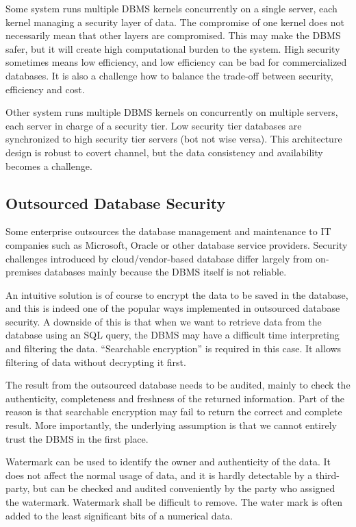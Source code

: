 Some system runs multiple DBMS kernels concurrently on a single server, each kernel managing a security layer of data. The compromise of one kernel does not necessarily mean that other layers are compromised. This may make the DBMS safer, but it will create high computational burden to the system. High security sometimes means low efficiency, and low efficiency can be bad for commercialized databases. It is also a challenge how to balance the trade-off between security, efficiency and cost.

Other system runs multiple DBMS kernels on concurrently on multiple servers, each server in charge of a security tier. Low security tier databases are synchronized to high security tier servers (bot not wise versa). This architecture design is robust to covert channel, but the data consistency and availability becomes a challenge.

\subsection{Outsourced Database Security}

Some enterprise outsources the database management and maintenance to IT companies such as Microsoft, Oracle or other database service providers. Security challenges introduced by cloud/vendor-based database differ largely from on-premises databases mainly because the DBMS itself is not reliable.

An intuitive solution is of course to encrypt the data to be saved in the database, and this is indeed one of the popular ways implemented in outsourced database security. A downside of this is that when we want to retrieve data from the database using an SQL query, the DBMS may have a difficult time interpreting and filtering the data. ``Searchable encryption'' is required in this case. It allows filtering of data without decrypting it first. 

The result from the outsourced database needs to be audited, mainly to check the authenticity, completeness and freshness of the returned information. Part of the reason is that searchable encryption may fail to return the correct and complete result. More importantly, the underlying assumption is that we cannot entirely trust the DBMS in the first place.

Watermark can be used to identify the owner and authenticity of the data. It does not affect the normal usage of data, and it is hardly detectable by a third-party, but can be checked and audited conveniently by the party who assigned the watermark. Watermark shall be difficult to remove. The water mark is often added to the least significant bits of a numerical data.





